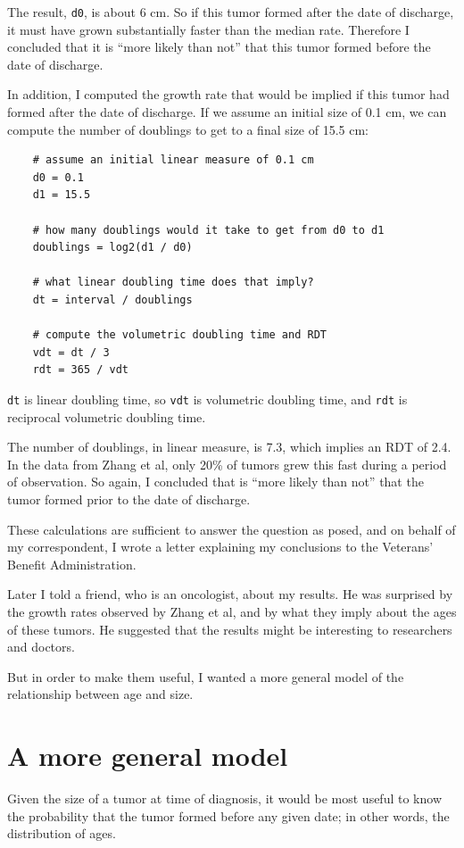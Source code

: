 \documentclass[12pt]{book}
\begin{document}
The result, {\tt d0}, is about 6 cm.  So if this tumor formed after
the date of discharge, it must have grown substantially faster than
the median rate.  Therefore I concluded that it is ``more likely than
not'' that this tumor formed before the date of discharge.

In addition, I computed the growth rate that would be implied
if this tumor had formed after the date of discharge.  If we
assume an initial size of 0.1 cm, we can compute the number of
doublings to get to a final size of 15.5 cm:

\begin{verbatim}
    # assume an initial linear measure of 0.1 cm
    d0 = 0.1
    d1 = 15.5

    # how many doublings would it take to get from d0 to d1
    doublings = log2(d1 / d0)

    # what linear doubling time does that imply?
    dt = interval / doublings

    # compute the volumetric doubling time and RDT
    vdt = dt / 3
    rdt = 365 / vdt
\end{verbatim}

{\tt dt} is linear doubling time, so {\tt vdt} is volumetric
doubling time, and {\tt rdt} is reciprocal volumetric doubling
time.

The number of doublings, in linear measure, is 7.3, which implies
an RDT of 2.4.  In the data from Zhang et al, only 20\% of tumors
grew this fast during a period of observation.  So again,
I concluded that is ``more likely than not'' that the tumor
formed prior to the date of discharge.

These calculations are sufficient to answer the question as
posed, and on behalf of my correspondent, I wrote a letter explaining
my conclusions to the Veterans' Benefit Administration.

Later I told a friend, who is an oncologist, about my results.  He was
surprised by the growth rates observed by Zhang et al, and by what
they imply about the ages of these tumors.  He suggested that the
results might be interesting to researchers and doctors.

But in order to make them useful, I wanted a more general model
of the relationship between age and size.


\section{A more general model}

Given the size of a tumor at time of diagnosis, it would be most
useful to know the probability that the tumor formed before
any given date; in other words, the distribution of ages.
\end{document}
